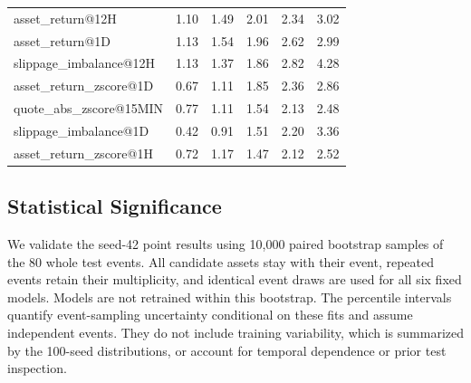 \documentclass{ieeeaccess}
\begin{document}
\begin{table}[!tbp]
{\begin{tabular}{lrrrrr}
        asset\_return@12H & \textcolor{revisionblue}{1.10} & \textcolor{revisionblue}{1.49} & \textcolor{revisionblue}{2.01} & \textcolor{revisionblue}{2.34} & \textcolor{revisionblue}{3.02} \\
        asset\_return@1D & \textcolor{revisionblue}{1.13} & \textcolor{revisionblue}{1.54} & \textcolor{revisionblue}{1.96} & \textcolor{revisionblue}{2.62} & \textcolor{revisionblue}{2.99} \\
        slippage\_imbalance@12H & \textcolor{revisionblue}{1.13} & \textcolor{revisionblue}{1.37} & \textcolor{revisionblue}{1.86} & \textcolor{revisionblue}{2.82} & \textcolor{revisionblue}{4.28} \\
        \textcolor{revisionblue}{asset\_return\_zscore@1D} & \textcolor{revisionblue}{0.67} & \textcolor{revisionblue}{1.11} & \textcolor{revisionblue}{1.85} & \textcolor{revisionblue}{2.36} & \textcolor{revisionblue}{2.86} \\
        \textcolor{revisionblue}{quote\_abs\_zscore@15MIN} & \textcolor{revisionblue}{0.77} & \textcolor{revisionblue}{1.11} & \textcolor{revisionblue}{1.54} & \textcolor{revisionblue}{2.13} & \textcolor{revisionblue}{2.48} \\
        \textcolor{revisionblue}{slippage\_imbalance@1D} & \textcolor{revisionblue}{0.42} & \textcolor{revisionblue}{0.91} & \textcolor{revisionblue}{1.51} & \textcolor{revisionblue}{2.20} & \textcolor{revisionblue}{3.36} \\
        asset\_return\_zscore@1H & \textcolor{revisionblue}{0.72} & \textcolor{revisionblue}{1.17} & \textcolor{revisionblue}{1.47} & \textcolor{revisionblue}{2.12} & \textcolor{revisionblue}{2.52} \\
        \bottomrule
    \end{tabular}
    }
    \label{table:feature_importance_quantiles}
\end{table}

\subsection{Statistical Significance}
\label{sec:significance}
\textcolor{revisionblue}{We validate the seed-42 point results using 10{,}000 paired bootstrap samples of the 80 whole test events. All candidate assets stay with their event, repeated events retain their multiplicity, and identical event draws are used for all six fixed models. Models are not retrained within this bootstrap. The percentile intervals quantify event-sampling uncertainty conditional on these fits and assume independent events. They do not include training variability, which is summarized by the 100-seed distributions, or account for temporal dependence or prior test inspection.}
\end{document}
